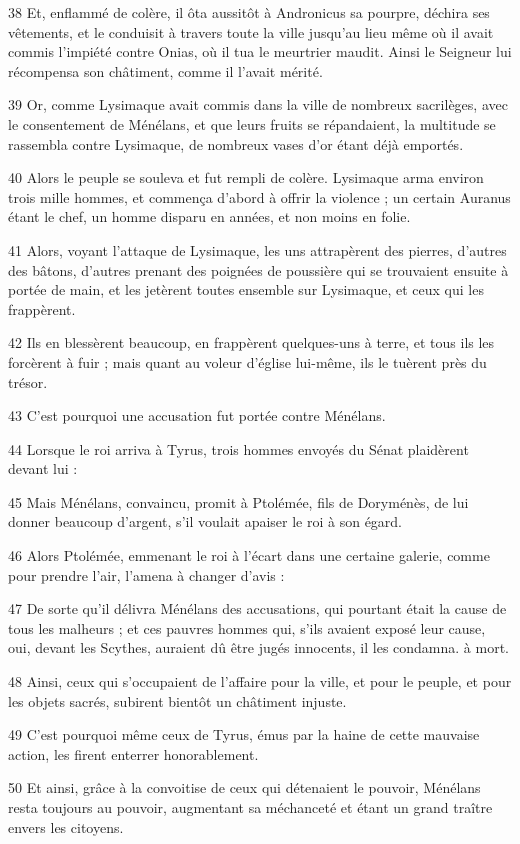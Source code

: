 \par 38 Et, enflammé de colère, il ôta aussitôt à Andronicus sa pourpre, déchira ses vêtements, et le conduisit à travers toute la ville jusqu'au lieu même où il avait commis l'impiété contre Onias, où il tua le meurtrier maudit. Ainsi le Seigneur lui récompensa son châtiment, comme il l'avait mérité.
\par 39 Or, comme Lysimaque avait commis dans la ville de nombreux sacrilèges, avec le consentement de Ménélans, et que leurs fruits se répandaient, la multitude se rassembla contre Lysimaque, de nombreux vases d'or étant déjà emportés.
\par 40 Alors le peuple se souleva et fut rempli de colère. Lysimaque arma environ trois mille hommes, et commença d'abord à offrir la violence ; un certain Auranus étant le chef, un homme disparu en années, et non moins en folie.
\par 41 Alors, voyant l'attaque de Lysimaque, les uns attrapèrent des pierres, d'autres des bâtons, d'autres prenant des poignées de poussière qui se trouvaient ensuite à portée de main, et les jetèrent toutes ensemble sur Lysimaque, et ceux qui les frappèrent.
\par 42 Ils en blessèrent beaucoup, en frappèrent quelques-uns à terre, et tous ils les forcèrent à fuir ; mais quant au voleur d'église lui-même, ils le tuèrent près du trésor.
\par 43 C'est pourquoi une accusation fut portée contre Ménélans.
\par 44 Lorsque le roi arriva à Tyrus, trois hommes envoyés du Sénat plaidèrent devant lui :
\par 45 Mais Ménélans, convaincu, promit à Ptolémée, fils de Doryménès, de lui donner beaucoup d'argent, s'il voulait apaiser le roi à son égard.
\par 46 Alors Ptolémée, emmenant le roi à l'écart dans une certaine galerie, comme pour prendre l'air, l'amena à changer d'avis :
\par 47 De sorte qu'il délivra Ménélans des accusations, qui pourtant était la cause de tous les malheurs ; et ces pauvres hommes qui, s'ils avaient exposé leur cause, oui, devant les Scythes, auraient dû être jugés innocents, il les condamna. à mort.
\par 48 Ainsi, ceux qui s'occupaient de l'affaire pour la ville, et pour le peuple, et pour les objets sacrés, subirent bientôt un châtiment injuste.
\par 49 C'est pourquoi même ceux de Tyrus, émus par la haine de cette mauvaise action, les firent enterrer honorablement.
\par 50 Et ainsi, grâce à la convoitise de ceux qui détenaient le pouvoir, Ménélans resta toujours au pouvoir, augmentant sa méchanceté et étant un grand traître envers les citoyens.

